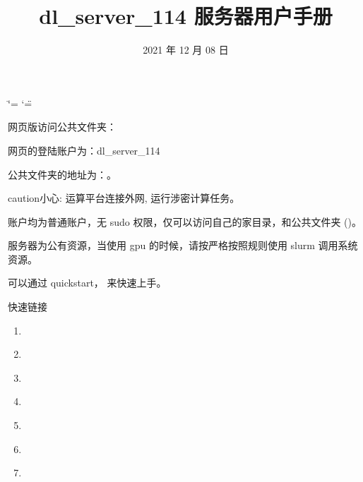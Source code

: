\documentclass[a4paper,12pt,english]{sphinxmanual}
\title{dl\_server\_114 服务器用户手册}
\date{2021 年 12 月 08 日}
\author{}
\begin{document}
\ifdefined\shorthandoff
  \ifnum\catcode`\=\string=\active\shorthandoff{=}\fi
  \ifnum\catcode`\"=\active{}\fi
\fi

\pagestyle{empty}
\sphinxmaketitle
\pagestyle{plain}
\sphinxtableofcontents
\pagestyle{normal}
\label{\detokenize{index::doc}}


\sphinxAtStartPar
网页版访问公共文件夹：

\sphinxAtStartPar
网页的登陆账户为：dl\_server\_114

\sphinxAtStartPar
公共文件夹的地址为：。

\begin{sphinxadmonition}{caution}{小心:}
\sphinxAtStartPar
运算平台连接外网,  运行涉密计算任务。
\end{sphinxadmonition}

\sphinxAtStartPar
账户均为普通账户，无 sudo 权限，仅可以访问自己的家目录，和公共文件夹 ()。

\sphinxAtStartPar
服务器为公有资源，当使用 gpu 的时候，请按严格按照规则使用 slurm 调用系统资源。

\sphinxAtStartPar
可以通过 quickstart， 来快速上手。

\sphinxAtStartPar
快速链接
\begin{enumerate}
%
\item {} 
\sphinxAtStartPar
{\hyperref[\detokenize{quickstart/index::doc}]{}}

\item {} 
\sphinxAtStartPar
{\hyperref[\detokenize{system/index::doc}]{}}

\item {} 
\sphinxAtStartPar
{\hyperref[\detokenize{accounts/index::doc}]{}}

\item {} 
\sphinxAtStartPar
{}

\item {} 
\sphinxAtStartPar
{\hyperref[\detokenize{login/index::doc}]{}}

\item {} 
\sphinxAtStartPar
{\hyperref[\detokenize{job/index::doc}]{}}

\item {} 
\sphinxAtStartPar
{\hyperref[\detokenize{faq/index::doc}]{}}

\end{enumerate}
\end{document}
